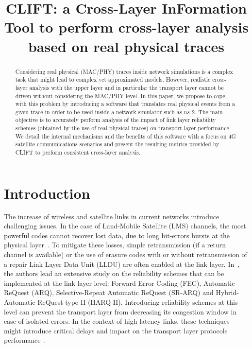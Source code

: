 \documentclass[conference,letterpaper]{IEEEtran}
\begin{document}
\title{CLIFT: a Cross-Layer InFormation Tool to perform cross-layer analysis based on real physical traces}  

\author{
}

\maketitle

\begin{abstract}
Considering real physical (MAC/PHY) traces inside network simulations is a complex task that might lead to complex yet approximated models.
However, realistic cross-layer analysis with the upper layer and in particular the transport layer cannot be driven without considering the MAC/PHY level.
In this paper, we propose to cope with this problem by introducing a software that translates real physical events from a given trace in order to be used inside a network simulator such as $ns$-2.
The main objective is to accurately perform analysis of the impact of link layer reliability schemes (obtained by the use of real physical traces) on transport layer performance. 
We detail the internal mechanisms and the benefits of this software with a focus on 4G satellite communications scenarios and present the resulting metrics provided by CLIFT to perform consistent cross-layer analysis.
\end{abstract}

\section{Introduction}
\label{sec::introduction}


The increase of wireless and satellite links in current networks introduce challenging issues. In the case of Land-Mobile Satellite (LMS) channels, the most powerful codes cannot recover lost data, due to long bit-errors bursts at the physical layer~\cite{lms_state}. To mitigate these losses, simple retransmission (if a return channel is available) or the use of erasure codes with or without retransmission of a repair Link Layer Data Unit (LLDU) are often enabled at the link layer. In~\cite{link_layer_rel}, the authors lead an extensive study on the reliability schemes that can be implemented at the link layer level: Forward Error Coding (FEC), Automatic ReQuest (ARQ), Selective-Repeat Automatic ReQuest (SR-ARQ) and Hybrid-Automatic ReQuest type II (HARQ-II). Introducing reliability schemes at this level can prevent the transport layer from decreasing its congestion window in case of isolated errors. In the context of high latency links, these techniques might introduce critical delays and impact on the transport layer protocols performance~\cite{high_bd_del_prod}. 
\end{document}
